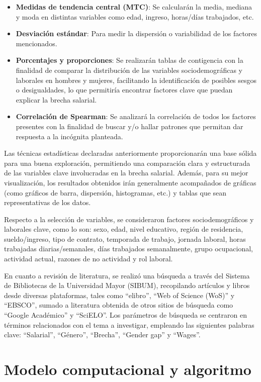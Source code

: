 \begin{itemize}
	\item \textbf{Medidas de tendencia central (MTC)}: Se calcularán la media, mediana y moda en distintas variables como edad, ingreso, horas/días trabajados, etc.
	\item \textbf{Desviación estándar}: Para medir la dispersión o variabilidad de los factores mencionados.
	\item \textbf{Porcentajes y proporciones}: Se realizarán tablas de contigencia con la finalidad de comparar la distribución de las variables sociodemográficas y laborales en hombres y mujeres, facilitando la identificación de posibles sesgos o desigualdades, lo que permitiría encontrar factores clave que puedan explicar la brecha salarial.
	\item \textbf{Correlación de Spearman}: Se analizará la correlación de todos los factores presentes con la finalidad de buscar y/o hallar patrones que permitan dar respuesta a la incógnita planteada.
\end{itemize}

Las técnicas estadísticas declaradas anteriormente proporcionarán una base sólida para una buena exploración, permitiendo una comparación clara y estructurada de las variables clave involucradas en la brecha salarial. Además, para su mejor visualización, los resultados obtenidos irán generalmente acompañados de gráficas (como gráficos de barra, dispersión, histogramas, etc.) y tablas que sean representativas de los datos.

Respecto a la selección de variables, se consideraron factores sociodemográficos y laborales clave, como lo son: sexo, edad, nivel educativo, región de residencia, sueldo/ingreso, tipo de contrato, temporada de trabajo, jornada laboral, horas trabajadas diarias/semanales, días trabajados semanalmente, grupo ocupacional, actividad actual, razones de no actividad y rol laboral.

En cuanto a revisión de literatura, se realizó una búsqueda a través del Sistema de Bibliotecas de la Universidad Mayor (SIBUM), recopilando artículos y libros desde diversas plataformas, tales como ``elibro'', ``Web of Science (WoS)'' y ``EBSCO'', sumado a literatura obtenida de otros sitios de búsqueda como ``Google Académico'' y ``SciELO''. Los parámetros de búsqueda se centraron en términos relacionados con el tema a investigar, empleando las siguientes palabras clave: ``Salarial'', ``Género'', ``Brecha'', ``Gender gap'' y ``Wages''. 

\section{Modelo computacional y algoritmo}

